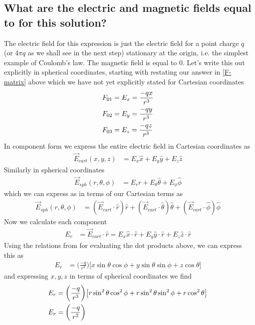 \subsection{What are the electric and magnetic fields equal to for this solution?}
The electric field for this expression is just the electric field for a point charge $q$ (or $4 \pi q$ as we shall see in the next step) stationary at the origin, i.e. the simplest example of Coulomb's law. The magnetic field is equal to $0$. Let's write this out explicitly in spherical coordinates, starting with restating our answer in \ref{F-matrix} above which we have not yet explicitly stated for Cartesian coordinates
%
\begin{align}
	F_{0 1} &= E_x = \frac{-q x}{r^3} \notag \\
	F_{0 2} &= E_y = \frac{-q y}{r^3} \\
	F_{0 3} &= E_z = \frac{-q z}{r^3} \notag
\end{align}
%
In component form we express the entire electric field in Cartesian coordinates as
%
\begin{align}
	\vec{E}_{cart}(x, y, z) &= E_x \hat{x} + E_y \hat{y} + E_z \hat{z} 
\end{align}
%
Similarly in spherical coordinates 
%
\begin{align}
	\vec{E}_{sph}(r, \theta, \phi) &= E_r \hat{r} + E_{\theta} \hat{\theta} + E_{\phi} \hat{\phi} 
\end{align}
%
which we can express as in terms of our Cartesian terms as 
%
\begin{align}
	\vec{E}_{sph}(r, \theta, \phi) &= (\vec{E}_{cart} \cdot \hat{r}) \hat{r} +(\vec{E}_{cart} \cdot \hat{\theta}) \hat{\theta} + (\vec{E}_{cart} \cdot \hat{\phi}) \hat{\phi} 
\end{align}
%
Now we calculate each component
%
\begin{align}
	E_r &= \vec{E}_{cart} \cdot \hat{r} = E_x \hat{x} \cdot \hat{r} + E_y \hat{y} \cdot \hat{r} + E_z \hat{z} \cdot \hat{r}
\end{align}
%
Using the relations from \cite{wiki:Vector_fields_in_cylindrical_and_spherical_coordinates} for evaluating the dot products above, we can express this as
%
\begin{align}
	E_r &= \bigg( \frac{-q}{r^3} \bigg) \big[ x \sin{\theta} \cos{\phi} + y \sin{\theta} \sin{\phi} + z \cos{\theta} \big]
\end{align}
%
and expressing $x, y, z$ in terms of spherical coordinates we find
%
\begin{align}
	E_r &= \bigg( \frac{-q}{r^3} \bigg) \big[ r \sin^2{\theta} \cos^2{\phi} + r \sin^2{\theta} \sin^2{\phi} + r \cos^2{\theta} \big]  \notag  \\ 
	E_r & = \bigg( \frac{-q}{r^2} \bigg)
\end{align}
